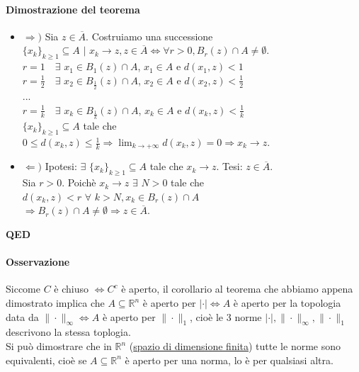 \documentclass{article}
\newcommand{\R}{\mathbb{R}}
\begin{document}
\paragraph{{Dimostrazione del teorema}}
\begin{itemize}
    \item $\Rightarrow ) $ Sia $z \in \overline{A}$. Costruiamo una successione $\{x_k\}_{k \geq 1} \subseteq A \,\,|\,\, x_k \rightarrow z, z\in \overline{A} \Leftrightarrow \forall r >0, B_r(z)\cap A \neq \emptyset$.\\
    $r=1\,\,\,\,\,\, \exists\,\, x_1 \in B_1(z) \cap A$, $x_1 \in A$ e $d(x_1,z)<1$\\
    $r=\frac{1}{2}\,\,\,\,\,\, \exists \,\,x_2 \in B_{\frac{1}{2}}(z) \cap A$, $ x_2 \in A $ e $ d(x_2,z)< \frac{1}{2}$\\
    ...\\
    $r=\frac{1}{k}\,\,\,\,\,\, \exists\,\, x_k \in B_{\frac{1}{k}}(z)\cap A$, $ x_k \in A $ e $ d(x_k,z)< \frac{1}{k}$\\
    $\{x_k\}_{k \geq 1} \subseteq A$ tale che $0 \leq d(x_k,z)\leq \frac{1}{k} \Rightarrow \lim_{k \rightarrow +\infty} d(x_k,z)=0 \Rightarrow x_k \rightarrow z$.
    \item $\Leftarrow )$ Ipotesi: $\exists \,\, \{x_k\}_{k\geq 1} \subseteq A$ tale che $x_k \rightarrow z$. Tesi: $z \in \overline{A}$.\\
    Sia $r >0$. Poichè $x_k \rightarrow z \,\, \exists \,\, N> 0$ tale che $d(x_k,z)<r\,\, \forall \,\, k > N, x_k \in B_r(z) \cap A$\\
    $ \Rightarrow B_r(z) \cap A \neq \emptyset \Rightarrow z \in \overline{A}$. 
\end{itemize}
\begin{flushright}
\textbf{QED}
\end{flushright}

\paragraph{{Osservazione}}
Siccome $C$ è chiuso $\Leftrightarrow C^c$ è aperto, il corollario al teorema che abbiamo appena dimostrato implica che $A \subseteq \R^n$ è aperto per $|\cdot|  \Leftrightarrow A $ è aperto per la topologia data da $\| \cdot \|_\infty \Leftrightarrow A$ è aperto per $\| \cdot \|_1$, cioè le 3 norme $|\cdot|, \| \cdot \|_\infty, \| \cdot \|_1$ descrivono la stessa toplogia.\\
Si può dimostrare che in $\R^n$ (\underline{spazio di dimensione finita}) tutte le norme sono equivalenti, cioè se $A \subseteq \R^n$ è aperto per una norma, lo è per qualsiasi altra.
\end{document}
